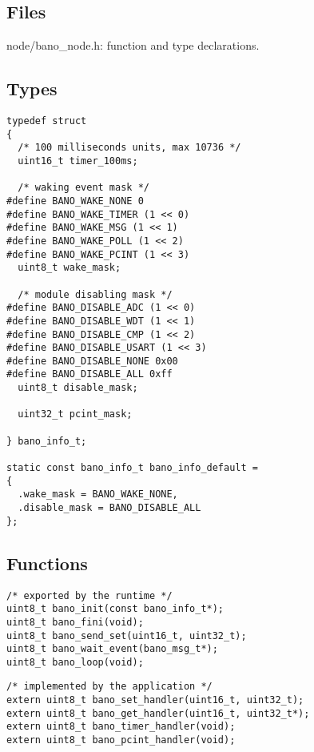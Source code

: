 \documentclass[a4paper, 11pt]{article}
\begin{document}
\subsection{Files}
node/bano\_node.h: function and type declarations.

\subsection{Types}
\begin{scriptsize}
\begin{verbatim}
typedef struct
{
  /* 100 milliseconds units, max 10736 */
  uint16_t timer_100ms;

  /* waking event mask */
#define BANO_WAKE_NONE 0
#define BANO_WAKE_TIMER (1 << 0)
#define BANO_WAKE_MSG (1 << 1)
#define BANO_WAKE_POLL (1 << 2)
#define BANO_WAKE_PCINT (1 << 3)
  uint8_t wake_mask;

  /* module disabling mask */
#define BANO_DISABLE_ADC (1 << 0)
#define BANO_DISABLE_WDT (1 << 1)
#define BANO_DISABLE_CMP (1 << 2)
#define BANO_DISABLE_USART (1 << 3)
#define BANO_DISABLE_NONE 0x00
#define BANO_DISABLE_ALL 0xff
  uint8_t disable_mask;

  uint32_t pcint_mask;

} bano_info_t;

static const bano_info_t bano_info_default =
{
  .wake_mask = BANO_WAKE_NONE,
  .disable_mask = BANO_DISABLE_ALL
};
\end{verbatim}
\end{scriptsize}


\subsection{Functions}
\begin{scriptsize}
\begin{verbatim}
/* exported by the runtime */
uint8_t bano_init(const bano_info_t*);
uint8_t bano_fini(void);
uint8_t bano_send_set(uint16_t, uint32_t);
uint8_t bano_wait_event(bano_msg_t*);
uint8_t bano_loop(void);
\end{verbatim}
\end{scriptsize}

\begin{scriptsize}
\begin{verbatim}
/* implemented by the application */
extern uint8_t bano_set_handler(uint16_t, uint32_t);
extern uint8_t bano_get_handler(uint16_t, uint32_t*);
extern uint8_t bano_timer_handler(void);
extern uint8_t bano_pcint_handler(void);
\end{verbatim}
\end{scriptsize}
\end{document}
